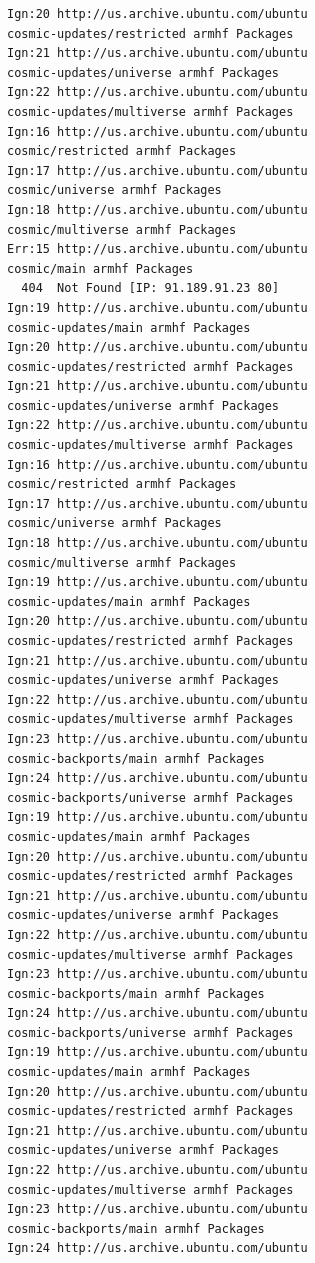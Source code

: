 \begin{verbatim}
Ign:20 http://us.archive.ubuntu.com/ubuntu 
cosmic-updates/restricted armhf Packages
Ign:21 http://us.archive.ubuntu.com/ubuntu 
cosmic-updates/universe armhf Packages
Ign:22 http://us.archive.ubuntu.com/ubuntu 
cosmic-updates/multiverse armhf Packages
Ign:16 http://us.archive.ubuntu.com/ubuntu 
cosmic/restricted armhf Packages
Ign:17 http://us.archive.ubuntu.com/ubuntu 
cosmic/universe armhf Packages
Ign:18 http://us.archive.ubuntu.com/ubuntu 
cosmic/multiverse armhf Packages
Err:15 http://us.archive.ubuntu.com/ubuntu 
cosmic/main armhf Packages
  404  Not Found [IP: 91.189.91.23 80]
Ign:19 http://us.archive.ubuntu.com/ubuntu 
cosmic-updates/main armhf Packages
Ign:20 http://us.archive.ubuntu.com/ubuntu 
cosmic-updates/restricted armhf Packages
Ign:21 http://us.archive.ubuntu.com/ubuntu 
cosmic-updates/universe armhf Packages
Ign:22 http://us.archive.ubuntu.com/ubuntu 
cosmic-updates/multiverse armhf Packages
Ign:16 http://us.archive.ubuntu.com/ubuntu 
cosmic/restricted armhf Packages
Ign:17 http://us.archive.ubuntu.com/ubuntu 
cosmic/universe armhf Packages
Ign:18 http://us.archive.ubuntu.com/ubuntu 
cosmic/multiverse armhf Packages
Ign:19 http://us.archive.ubuntu.com/ubuntu 
cosmic-updates/main armhf Packages
Ign:20 http://us.archive.ubuntu.com/ubuntu 
cosmic-updates/restricted armhf Packages
Ign:21 http://us.archive.ubuntu.com/ubuntu 
cosmic-updates/universe armhf Packages
Ign:22 http://us.archive.ubuntu.com/ubuntu 
cosmic-updates/multiverse armhf Packages
Ign:23 http://us.archive.ubuntu.com/ubuntu 
cosmic-backports/main armhf Packages
Ign:24 http://us.archive.ubuntu.com/ubuntu 
cosmic-backports/universe armhf Packages
Ign:19 http://us.archive.ubuntu.com/ubuntu 
cosmic-updates/main armhf Packages
Ign:20 http://us.archive.ubuntu.com/ubuntu 
cosmic-updates/restricted armhf Packages
Ign:21 http://us.archive.ubuntu.com/ubuntu 
cosmic-updates/universe armhf Packages
Ign:22 http://us.archive.ubuntu.com/ubuntu 
cosmic-updates/multiverse armhf Packages
Ign:23 http://us.archive.ubuntu.com/ubuntu 
cosmic-backports/main armhf Packages
Ign:24 http://us.archive.ubuntu.com/ubuntu 
cosmic-backports/universe armhf Packages
Ign:19 http://us.archive.ubuntu.com/ubuntu 
cosmic-updates/main armhf Packages
Ign:20 http://us.archive.ubuntu.com/ubuntu 
cosmic-updates/restricted armhf Packages
Ign:21 http://us.archive.ubuntu.com/ubuntu 
cosmic-updates/universe armhf Packages
Ign:22 http://us.archive.ubuntu.com/ubuntu 
cosmic-updates/multiverse armhf Packages
Ign:23 http://us.archive.ubuntu.com/ubuntu 
cosmic-backports/main armhf Packages
Ign:24 http://us.archive.ubuntu.com/ubuntu 

\end{verbatim}
